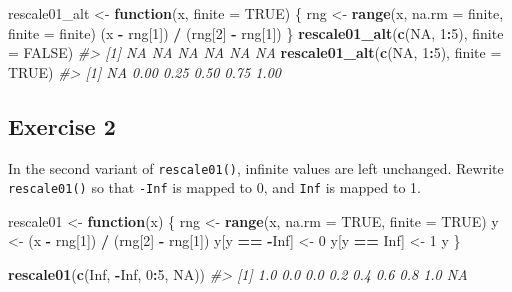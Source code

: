 \documentclass[]{book}
\newenvironment{Shaded}{\begin{snugshade}}{\end{snugshade}}
\newcommand{\CommentTok}[1]{\textcolor[rgb]{0.56,0.35,0.01}{\textit{#1}}}
\newcommand{\ControlFlowTok}[1]{\textcolor[rgb]{0.13,0.29,0.53}{\textbf{#1}}}
\newcommand{\DataTypeTok}[1]{\textcolor[rgb]{0.13,0.29,0.53}{#1}}
\newcommand{\DecValTok}[1]{\textcolor[rgb]{0.00,0.00,0.81}{#1}}
\newcommand{\KeywordTok}[1]{\textcolor[rgb]{0.13,0.29,0.53}{\textbf{#1}}}
\newcommand{\NormalTok}[1]{#1}
\newcommand{\OperatorTok}[1]{\textcolor[rgb]{0.81,0.36,0.00}{\textbf{#1}}}
\newcommand{\OtherTok}[1]{\textcolor[rgb]{0.56,0.35,0.01}{#1}}
\newcommand{\StringTok}[1]{\textcolor[rgb]{0.31,0.60,0.02}{#1}}
\theoremstyle{plain}
\theoremstyle{remark}
\theoremstyle{definition}
\theoremstyle{definition}
\theoremstyle{definition}
\theoremstyle{remark}
\begin{document}
\begin{Shaded}
\begin{Highlighting}[]
\NormalTok{rescale01_alt <-}\StringTok{ }\ControlFlowTok{function}\NormalTok{(x, }\DataTypeTok{finite =} \OtherTok{TRUE}\NormalTok{) \{}
\NormalTok{  rng <-}\StringTok{ }\KeywordTok{range}\NormalTok{(x, }\DataTypeTok{na.rm =}\NormalTok{ finite, }\DataTypeTok{finite =}\NormalTok{ finite)}
\NormalTok{  (x }\OperatorTok{-}\StringTok{ }\NormalTok{rng[}\DecValTok{1}\NormalTok{]) }\OperatorTok{/}\StringTok{ }\NormalTok{(rng[}\DecValTok{2}\NormalTok{] }\OperatorTok{-}\StringTok{ }\NormalTok{rng[}\DecValTok{1}\NormalTok{])}
\NormalTok{\}}
\KeywordTok{rescale01_alt}\NormalTok{(}\KeywordTok{c}\NormalTok{(}\OtherTok{NA}\NormalTok{, }\DecValTok{1}\OperatorTok{:}\DecValTok{5}\NormalTok{), }\DataTypeTok{finite =} \OtherTok{FALSE}\NormalTok{)}
\CommentTok{#> [1] NA NA NA NA NA NA}
\KeywordTok{rescale01_alt}\NormalTok{(}\KeywordTok{c}\NormalTok{(}\OtherTok{NA}\NormalTok{, }\DecValTok{1}\OperatorTok{:}\DecValTok{5}\NormalTok{), }\DataTypeTok{finite =} \OtherTok{TRUE}\NormalTok{)}
\CommentTok{#> [1]   NA 0.00 0.25 0.50 0.75 1.00}
\end{Highlighting}
\end{Shaded}

\hypertarget{exercise-2-47}{%
\subsection{Exercise 2}\label{exercise-2-47}}

In the second variant of \texttt{rescale01()}, infinite values are left
unchanged. Rewrite \texttt{rescale01()} so that \texttt{-Inf} is mapped
to 0, and \texttt{Inf} is mapped to 1.

\begin{Shaded}
\begin{Highlighting}[]
\NormalTok{rescale01 <-}\StringTok{ }\ControlFlowTok{function}\NormalTok{(x) \{}
\NormalTok{  rng <-}\StringTok{ }\KeywordTok{range}\NormalTok{(x, }\DataTypeTok{na.rm =} \OtherTok{TRUE}\NormalTok{, }\DataTypeTok{finite =} \OtherTok{TRUE}\NormalTok{)}
\NormalTok{  y <-}\StringTok{ }\NormalTok{(x }\OperatorTok{-}\StringTok{ }\NormalTok{rng[}\DecValTok{1}\NormalTok{]) }\OperatorTok{/}\StringTok{ }\NormalTok{(rng[}\DecValTok{2}\NormalTok{] }\OperatorTok{-}\StringTok{ }\NormalTok{rng[}\DecValTok{1}\NormalTok{])}
\NormalTok{  y[y }\OperatorTok{==}\StringTok{ }\OperatorTok{-}\OtherTok{Inf}\NormalTok{] <-}\StringTok{ }\DecValTok{0}
\NormalTok{  y[y }\OperatorTok{==}\StringTok{ }\OtherTok{Inf}\NormalTok{] <-}\StringTok{ }\DecValTok{1}
\NormalTok{  y}
\NormalTok{\}}

\KeywordTok{rescale01}\NormalTok{(}\KeywordTok{c}\NormalTok{(}\OtherTok{Inf}\NormalTok{, }\OperatorTok{-}\OtherTok{Inf}\NormalTok{, }\DecValTok{0}\OperatorTok{:}\DecValTok{5}\NormalTok{, }\OtherTok{NA}\NormalTok{))}
\CommentTok{#> [1] 1.0 0.0 0.0 0.2 0.4 0.6 0.8 1.0  NA}
\end{Highlighting}
\end{Shaded}
\end{document}
